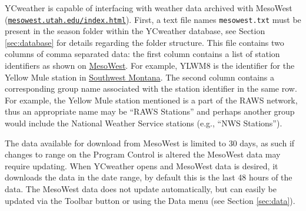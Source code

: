 \label{sec:mesowest}
YCweather is capable of interfacing with weather data archived with MesoWest (\href{http://mesowest.utah.edu/index.html}{\nolinkurl{mesowest.utah.edu/index.html}}).  First, a text file names \texttt{mesowest.txt} must be present in the season folder within the YCweather database, see Section \ref{sec:database} for details regarding the folder structure.  This file contains two columns of comma separated data: the first column contains a list of station identifiers as shown on \href{http://mesowest.utah.edu/index.html}{MesoWest}.  For example, YLWM8 is the identifier for the Yellow Mule station in \href{http://mesowest.utah.edu/cgi-bin/droman/mesomap.cgi?state=MT&rawsflag=3}{Southwest Montana}.  The second column contains a corresponding group name associated with the station identifier in the same row.  For example, the Yellow Mule station mentioned is a part of the RAWS network, thus an appropriate name may be ``RAWS Stations'' and perhaps another group would include the National Weather Service stations (e.g., ``NWS Stations'').

The data available for download from MesoWest is limited to 30 days, as such if changes to range on the Program Control is altered the MesoWest data may require updating.  When YCweather opens and MesoWest data is desired, it downloads the data in the date range, by default this is the last 48 hours of the data.  The MesoWest data does not update automatically, but can easily be updated via the Toolbar button or using the Data menu (see Section \ref{sec:data}).


